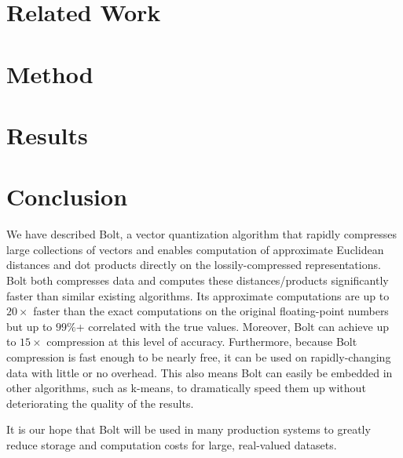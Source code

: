 \documentclass[sigconf]{acmart}  %
\begin{document}
% 

\section{Related Work} \label{sec:relatedWork}



\section{Method} \label{sec:method}



\section{Results} \label{sec:results}



\section{Conclusion} \label{sec:conclusion}

We have described Bolt, a vector quantization algorithm that rapidly compresses large collections of vectors and enables computation of approximate Euclidean distances and dot products directly on the lossily-compressed representations. Bolt both compresses data and computes these distances/products significantly faster than similar existing algorithms. Its approximate computations are up to $20\times$ faster than the exact computations on the original floating-point numbers but up to $99\%$+ correlated with the true values. Moreover, Bolt can achieve up to $15\times$ compression at this level of accuracy. Furthermore, because Bolt compression is fast enough to be nearly free, it can be used on rapidly-changing data with little or no overhead. This also means Bolt can easily be embedded in other algorithms, such as k-means, to dramatically speed them up without deteriorating the quality of the results.

It is our hope that Bolt will be used in many production systems to greatly reduce storage and computation costs for large, real-valued datasets.




\end{document}
